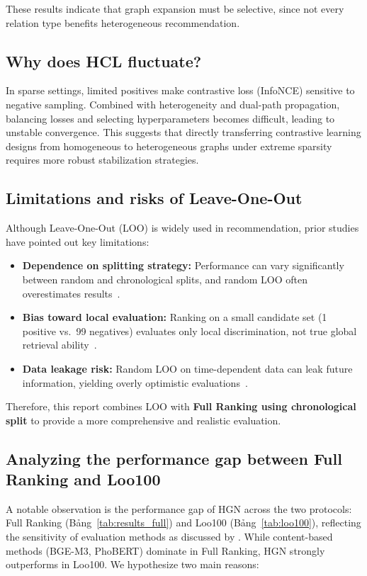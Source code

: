 \documentclass[11pt]{article}
\newcommand{\tabref}[1]{Bảng~\ref{#1}}
\begin{document}
These results indicate that graph expansion must be selective,
since not every relation type benefits heterogeneous recommendation.

\subsection{Why does HCL fluctuate?}
In sparse settings, limited positives make contrastive loss (InfoNCE) sensitive to negative sampling. Combined with heterogeneity and dual-path propagation, balancing losses and selecting hyperparameters becomes difficult, leading to unstable convergence. This suggests that directly transferring contrastive learning designs from homogeneous to heterogeneous graphs under extreme sparsity requires more robust stabilization strategies.

\subsection{Limitations and risks of Leave-One-Out}
Although Leave-One-Out (LOO) is widely used in recommendation,
prior studies have pointed out key limitations:
\begin{itemize}
    \item \textbf{Dependence on splitting strategy:}
          Performance can vary significantly between random and chronological splits,
          and random LOO often overestimates results~\citep{meng2020splitting}.
    \item \textbf{Bias toward local evaluation:}
          Ranking on a small candidate set (1 positive vs.\ 99 negatives) evaluates only local discrimination,
          not true global retrieval ability~\citep{sun2023evaluation}.
    \item \textbf{Data leakage risk:}
          Random LOO on time-dependent data can leak future information,
          yielding overly optimistic evaluations~\citep{wang2023leakage}.
\end{itemize}
Therefore, this report combines LOO with \textbf{Full Ranking using chronological split}
to provide a more comprehensive and realistic evaluation.

\subsection{Analyzing the performance gap between Full Ranking and Loo100}
A notable observation is the performance gap of HGN across the two protocols: Full Ranking (\tabref{tab:results_full}) and Loo100 (\tabref{tab:loo100}), reflecting the sensitivity of evaluation methods as discussed by \citet{meng2020splitting}. While content-based methods (BGE-M3, PhoBERT) dominate in Full Ranking, HGN strongly outperforms in Loo100. We hypothesize two main reasons:
\end{document}
